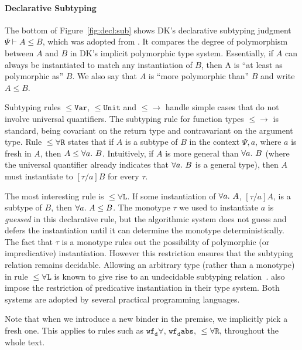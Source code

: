 
\paragraph{Declarative Subtyping}
The bottom of Figure~\ref{fig:decl:sub} shows DK's declarative subtyping judgment $\Psi \vdash A \le B$,
which was adopted from \citet{odersky1996putting}. It compares the
degree of polymorphism between $A$ and $B$ in DK's implicit polymorphic type system. 
Essentially, if $A$ can always be instantiated to match any instantiation of $B$,
then A is ``at least as polymorphic as'' $B$. We also 
say that $A$ is ``more polymorphic than'' $B$ and write $A \le B$.

Subtyping rules $\mathtt{{\le}Var}$, $\mathtt{{\le}Unit}$ and $\mathtt{{\le}{\to}}$
handle simple cases that do not involve universal quantifiers.
The subtyping rule for function types $\mathtt{{\le}{\to}}$ is standard,
being covariant on the return type and contravariant on the argument type.
Rule $\mathtt{{\le}\forall R}$ states that if $A$ is a subtype of $B$
in the context $\Psi, a$, where $a$ is fresh in $A$, then $A\le\all B$.
Intuitively, if $A$ is more general than $\all B$ (where the universal quantifier
already indicates that $\all B$ is a general type),
then $A$ must instantiate to $[\tau/a]B$ for every $\tau$.

The most interesting rule is $\mathtt{{\le}\forall L}$.
If some instantiation of $\all A$, $[\tau/a]A$, is a subtype of $B$,
then $\all A \le B$.
The monotype $\tau$ we used to instantiate $a$ is \emph{guessed} in this
declarative rule, but the algorithmic system does not guess and defers the
instantiation until it can determine the monotype deterministically.
The fact that $\tau$ is a monotype rules out the possibility of
polymorphic (or impredicative) instantiation.
However this restriction ensures that the subtyping relation remains
decidable. Allowing an arbitrary type (rather than a monotype) in rule $\mathtt{{\le}\forall L}$
is known to give rise to an undecidable subtyping relation~\citep{tiuryn1996subtyping}.
\citet{jones2007practical} also impose the restriction of
predicative instantiation in their type system.
Both systems are adopted by several practical programming languages.

Note that when we introduce a new binder in the premise, we implicitly pick a fresh one.
This applies to rules such as $\mathtt{wf_d\forall}$, $\mathtt{wf_dabs}$, $\mathtt{{\le}\forall R}$,
throughout the whole text.

